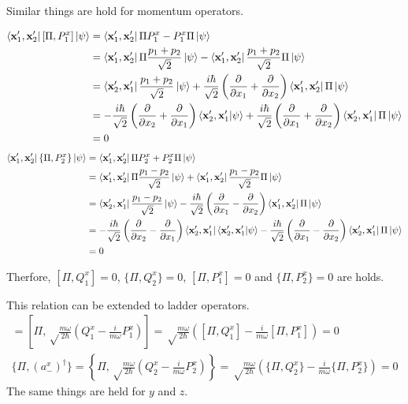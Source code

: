 \documentclass[a4paper,11pt]{article}
\begin{document}
Similar things are hold for momentum operators.

\begin{align}
    \bra{\mathbf x_1', \mathbf x_2'}[\Pi, P_1^x]\ket{\psi}
    &= \bra{\mathbf x_1', \mathbf x_2'}\Pi P_1^x - P_1^x\Pi\ket{\psi} \\
    &= \bra{\mathbf x_1', \mathbf x_2'}\Pi \frac{p_1+p_2}{\sqrt{2}}\ket{\psi} - \bra{\mathbf x_1', \mathbf x_2'}\frac{p_1+p_2}{\sqrt{2}}\Pi\ket{\psi}\\
    &= \bra{\mathbf x_2', \mathbf x_1'}\frac{p_1+p_2}{\sqrt{2}}\ket{\psi} + \frac{i\hbar}{\sqrt{2}}\left(\frac{\partial}{\partial x_1} + \frac{\partial}{\partial x_2}\right)\bra{\mathbf x_1', \mathbf x_2'}\Pi\ket{\psi}\\
    &= - \frac{i\hbar}{\sqrt{2}}\left(\frac{\partial}{\partial x_2} + \frac{\partial}{\partial x_1}\right)\braket{\mathbf x_2', \mathbf x_1'|\psi} + \frac{i\hbar}{\sqrt{2}}\left(\frac{\partial}{\partial x_1} + \frac{\partial}{\partial x_2}\right)\bra{\mathbf x_2', \mathbf x_1'}\Pi\ket{\psi}\\
    &= 0
\end{align}
\begin{align}
    \bra{\mathbf x_1', \mathbf x_2'}\{\Pi, P_2^x\}\ket{\psi}
    &= \bra{\mathbf x_1', \mathbf x_2'}\Pi P_2^x + P_2^x\Pi\ket{\psi} \\
    &= \bra{\mathbf x_1', \mathbf x_2'}\Pi \frac{p_1-p_2}{\sqrt{2}}\ket{\psi} + \bra{\mathbf x_1', \mathbf x_2'}\frac{p_1-p_2}{\sqrt{2}}\Pi\ket{\psi}\\
    &= \bra{\mathbf x_2', \mathbf x_1'}\frac{p_1-p_2}{\sqrt{2}}\ket{\psi} - \frac{i\hbar}{\sqrt{2}}\left(\frac{\partial}{\partial x_1} - \frac{\partial}{\partial x_2}\right)\bra{\mathbf x_1', \mathbf x_2'}\Pi\ket{\psi}\\
    &= - \frac{i\hbar}{\sqrt{2}}\left(\frac{\partial}{\partial x_2} - \frac{\partial}{\partial x_1}\right)\bra{\mathbf x_2', \mathbf x_1'}\braket{\mathbf x_2', \mathbf x_1'|\psi} - \frac{i\hbar}{\sqrt{2}}\left(\frac{\partial}{\partial x_1} - \frac{\partial}{\partial x_2}\right)\bra{\mathbf x_2', \mathbf x_1'}\Pi\ket{\psi}\\
    &= 0
\end{align}

Therfore, $[\Pi, Q_1^x]=0$, $\{\Pi, Q_2^x\}=0$, $[\Pi, P_1^x]=0$ and $\{\Pi, P_2^x\}=0$ are holds. 

This relation can be extended to ladder operators.
\begin{gather}
    [\Pi, (a_+^x)^\dagger] = \left[\Pi, \sqrt\frac{m\omega}{2\hbar}\left(Q_1^x-\frac{i}{m\omega}P_1^x\right)\right]= \sqrt\frac{m\omega}{2\hbar}\left([\Pi, Q_1^x]-\frac{i}{m\omega}[\Pi, P_1^x]\right)=0\\
    \{\Pi, (a_-^x)^\dagger\} = \left\{\Pi, \sqrt\frac{m\omega}{2\hbar}\left(Q_2^x-\frac{i}{m\omega}P_2^x\right)\right\}= \sqrt\frac{m\omega}{2\hbar}\left(\{\Pi, Q_2^x\}-\frac{i}{m\omega}\{\Pi, P_2^x\}\right)=0
\end{gather}
The same things are held for $y$ and $z$.
\end{document}
